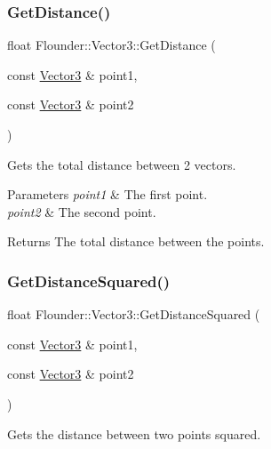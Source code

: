 \subsubsection{\texorpdfstring{Get\+Distance()}{GetDistance()}}
{\footnotesize\ttfamily float Flounder\+::\+Vector3\+::\+Get\+Distance (\begin{DoxyParamCaption}\item[{const \hyperlink{class_flounder_1_1_vector3}{Vector3} \&}]{point1,  }\item[{const \hyperlink{class_flounder_1_1_vector3}{Vector3} \&}]{point2 }\end{DoxyParamCaption})\hspace{0.3cm}{\ttfamily [static]}}



Gets the total distance between 2 vectors. 


\begin{DoxyParams}{Parameters}
{\em point1} & The first point. \\
\hline
{\em point2} & The second point. \\
\hline
\end{DoxyParams}
\begin{DoxyReturn}{Returns}
The total distance between the points. 
\end{DoxyReturn}
\mbox{\label{class_flounder_1_1_vector3_ae30f3777f5426d79369d3ff182d4a51c}} 
\subsubsection{\texorpdfstring{Get\+Distance\+Squared()}{GetDistanceSquared()}}
{\footnotesize\ttfamily float Flounder\+::\+Vector3\+::\+Get\+Distance\+Squared (\begin{DoxyParamCaption}\item[{const \hyperlink{class_flounder_1_1_vector3}{Vector3} \&}]{point1,  }\item[{const \hyperlink{class_flounder_1_1_vector3}{Vector3} \&}]{point2 }\end{DoxyParamCaption})\hspace{0.3cm}{\ttfamily [static]}}



Gets the distance between two points squared. 


